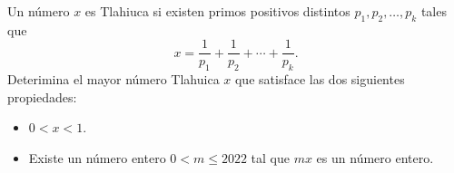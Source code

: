 Un número $x$ es Tlahiuca si existen primos positivos distintos $p_1,p_2,\dots,p_k$ tales que 
\[x=\frac{1}{p_1}+\frac{1}{p_2}+\cdots+\frac{1}{p_k}.\]
Deterimina el mayor número Tlahuica $x$ que satisface las dos siguientes propiedades:
 \begin{itemize} 
 \item  $0\lt x\lt 1$. 
 \item  Existe un número entero $0\lt m\leq 2022$ tal que $mx$ es un número entero. 
 \end{itemize} 